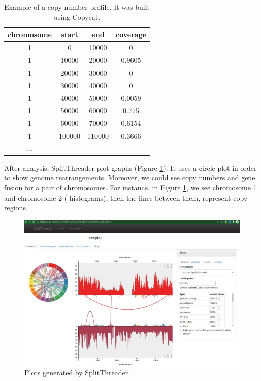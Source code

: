 \documentclass{svproc}
\begin{document}
\begin{table}[H]
	\centering
	\caption{Example of a copy number profile. It was built using Copycat.}
	\label{tab:cn}
	\begin{tabular}{cccc} 
		\hline
		\textbf{chromosome} & \textbf{start}  & \textbf{end}    & \textbf{coverage} \\ \hline
		1          & 0      & 10000  & 0        \\
		1          & 10000  & 20000  & 0.9605   \\
		1          & 20000  & 30000  & 0        \\
		1          & 30000  & 40000  & 0        \\
		1          & 40000  & 50000  & 0.0059   \\
		1          & 50000  & 60000  & 0.775    \\
		1          & 60000  & 70000  & 0.6154   \\
		1          & 100000 & 110000 & 0.3666  \\
		... \\ \hline
	\end{tabular}
\end{table}


After analysis, SplitThreader plot graphs (Figure \ref{fig:split_threader_2}). It uses a circle plot in order to show genome rearrangements. Moreover, we could see copy numbers and gene fusion for a pair of chromosomes. For instance, in Figure \ref{fig:split_threader_2}, we see chromosome 1 and chromosome 2 ( histograms), then the lines between them, represent copy regions.\\

\begin{figure}[H]
	\centering
	\includegraphics[width=\textwidth]{img/splitthreader/split_threader_2}
	\caption{Plots generated by SplitThreader.}
	\label{fig:split_threader_2}
\end{figure}
\end{document}
